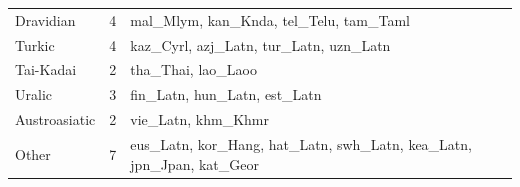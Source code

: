 \documentclass[dvipsnames]{article}
\begin{document}
\begin{table}[tbp]
{\begin{tabular}{@{}lcl@{}}
Dravidian       & 4        & mal\_Mlym, kan\_Knda, tel\_Telu, tam\_Taml                                                                                                                                                                                                                                                                       \\
Turkic          & 4        & kaz\_Cyrl, azj\_Latn, tur\_Latn, uzn\_Latn                                                                                                                                                                                                                                                                        \\
Tai-Kadai       & 2        & tha\_Thai, lao\_Laoo                                                                                                                                                                                                                                                                                               \\
Uralic          & 3        & fin\_Latn, hun\_Latn, est\_Latn                                                                                                                                                                                                                                                                                  \\
Austroasiatic   & 2        & vie\_Latn, khm\_Khmr                                                                                                                                                                                                                                                                                                \\
Other           & 7        & eus\_Latn, kor\_Hang, hat\_Latn, swh\_Latn, kea\_Latn, jpn\_Jpan, kat\_Geor  \\
\bottomrule
\end{tabular}
}
\end{table}
\end{document}
